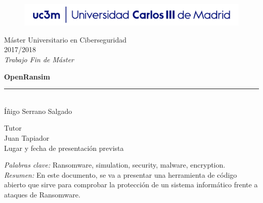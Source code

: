 \documentclass[a4paper,12pt]{article}
\begin{document}
\begin{titlepage}
\begin{sffamily}
\color{azulUC3M}
\begin{center}
\begin{figure}[htb]
\begin{center}
\vspace*{0.6cm}
\includegraphics[width=15cm]{imagenes/Portada_Logo.png}
\vspace*{1.6cm}
\end{center}
\end{figure}
\begin{LARGE}
Máster Universitario en Ciberseguridad \\%
2017/2018 \\%
\vspace*{1cm}
\textsl{Trabajo Fin de Máster}\\
\end{LARGE}
\Huge{\textbf{OpenRansim}}\\ %
\vspace*{1cm}
\rule{80mm}{0.1mm}\\
\huge{Íñigo Serrano Salgado}\\ %
\vspace*{0.5cm}
\begin{Large}
Tutor\\
Juan Tapiador\\
Lugar y fecha de presentación prevista\\
\end{Large}
\end{center}
\vspace*{2cm}
\color{black}
\emph{Palabras clave:} Ransomware, simulation, security, malware, encryption. \\
\emph{Resumen:} En este documento, se va a presentar una herramienta de código abierto que sirve para comprobar la protección de un sistema informático frente a ataques de Ransomware.\\

\end{sffamily}
\end{titlepage}
\end{document}
